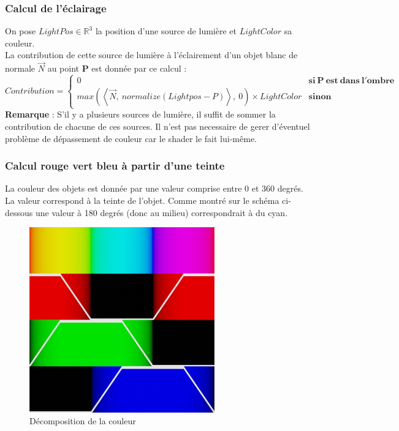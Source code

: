 \subsubsection{Calcul de l'éclairage}
On pose $LightPos \in \mathbb{R}^3$ la position d'une source de lumière et $LightColor$ sa couleur.
\\La contribution de cette source de lumière à l'éclairement d'un objet blanc de normale $\Vec{N}$ au point $\mathbf{P}$ est donnée par ce calcul :
$$
    Contribution=\left\{
        \begin{array}{ll}
            0 & \mathbf{si\ P\ est\ dans\ l'ombre} \\
            max(\left\langle \Vec{N},\ normalize(Lightpos-P) \right\rangle,\ 0) \times LightColor & \mathbf{sinon}
        \end{array}
    \right.
$$
\textbf{Remarque} : S'il y a plusieurs sources de lumière, il suffit de sommer la contribution de chacune de ces sources. Il n'est pas necessaire de gerer d'éventuel problème de dépassement de couleur car le shader le fait lui-même.

\newpage
\subsubsection{Calcul rouge vert bleu à partir d'une teinte}

La couleur des objets est donnée par une valeur comprise entre 0 et 360 degrés. La valeur correspond à la teinte de l'objet. Comme montré sur le schéma ci-dessous une valeur à 180 degrés (donc au milieu) correspondrait à du cyan.

\begin{figure}[h]
    \centering
    \includegraphics[width=8cm]{images/huetorgb.jpg}
    \caption{Décomposition de la couleur }\label{fig:huetorgb}
\end{figure}

